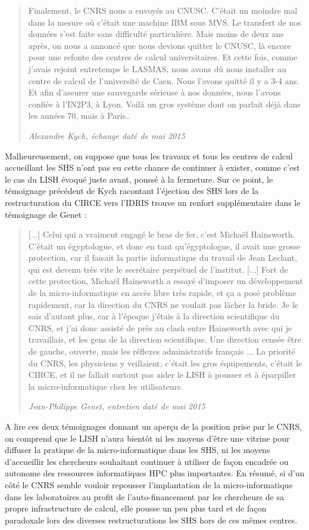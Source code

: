 \blockquote[\textit{Alexandre Kych, échange daté de mai 2015}]{Finalement, le CNRS nous a envoyés au CNUSC. C'était un moindre mal dans la mesure où c'était une machine IBM sous MVS. Le transfert de nos données s'est faite sans difficulté particulière. Mais moins de deux ans après, on nous a annoncé que nous devions quitter le CNUSC, là encore pour une refonte des centres de calcul universitaires. Et cette fois, comme j'avais rejoint entretemps le LASMAS, nous avons dû nous installer au centre de calcul de l'université de Caen. Nous l'avons quitté il y a 3-4 ans. Et afin d'assurer une sauvegarde sérieuse à nos données, nous l'avons confiée à l'IN2P3, à Lyon. Voilà un gros système dont on parlait déjà dans les années 70, mais à Paris..}

Malheureusement, on suppose que tous les travaux et tous les centres de calcul accueillant les SHS n'ont pas eu cette chance de continuer à exister, comme c'est le cas du LISH évoqué juste avant, poussé à la fermeture. Sur ce point, le témoignage précédent de Kych racontant l'éjection des SHS lors de la restructuration du CIRCE vers l'IDRIS trouve un renfort supplémentaire dans le témoignage de Genet :

\blockquote[\textit{Jean-Philippe Genet, entretien daté de mai 2015}]{[...] Celui qui a vraiment engagé le bras de fer, c'est Michaël Hainsworth. C'était un égyptologue, et donc en tant qu'égyptologue, il avait une grosse protection, car il faisait la partie informatique du travail de Jean Leclant, qui est devenu très vite le secrétaire perpétuel de l'institut. [...] Fort de cette protection, Michaël Hainsworth a essayé d'imposer un développement de la micro-informatique en accès libre très rapide, et ça a posé problème rapidement, car la direction du CNRS ne voulait pas lâcher la bride. Je le sais d'autant plus, car à l'époque j'étais à la direction scientifique du CNRS, et j'ai donc assisté de près au clash entre Hainsworth avec qui je travaillais, et les gens de la direction scientifique. Une direction censée être de gauche, ouverte, mais les réflexes administratifs français ... La priorité du CNRS, les physiciens y veillaient, c'était les gros équipements, c'était le CIRCE, et il ne fallait surtout pas aider le LISH à pousser et à éparpiller la micro-informatique chez les utilisateurs.}

A lire ces deux témoignages donnant un aperçu de la position prise par le CNRS, on comprend que le LISH n'aura bientôt ni les moyens d'être une vitrine pour diffuser la pratique de la micro-informatique dans les SHS, ni les moyens d'accueillir les chercheurs souhaitant continuer à utiliser de façon encadrée ou autonome des ressources informatiques HPC plus importantes. En résumé, si d'un côté le CNRS semble vouloir repousser l'implantation de la micro-informatique dans les laboratoires au profit de l'auto-financement par les chercheurs de sa propre infrastructure de calcul, elle pousse un peu plus tard et de façon paradoxale lors des diverses restructurations les SHS hors de ces mêmes centres.

